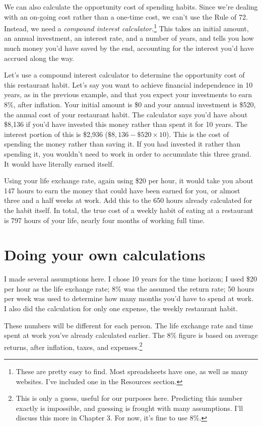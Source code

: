 We can also calculate the opportunity cost of spending habits. Since we're dealing with an on-going cost rather than a one-time cost, we can't use the Rule of 72. Instead, we need a \emph{compound interest calculator.}\footnote{These are pretty easy to find. Most spreadsheets have one, as well as many websites. I've included one in the Resources section.} This takes an initial amount, an annual investment, an interest rate, and a number of years, and tells you how much money you'd have saved by the end, accounting for the interest you'd have accrued along the way.

Let's use a compound interest calculator to determine the opportunity cost of this restaurant habit. Let's say you want to achieve financial independence in 10 years, as in the previous example, and that you expect your investments to earn 8\%, after inflation. Your initial amount is \$0 and your annual investment is \$520, the annual cost of your restaurant habit. The calculator says you'd have about \$8,136 if you'd have invested this money rather than spent it for 10 years. The interest portion of this is \$2,936 ($\$8,136 - \$520 \times 10$). This is the cost of spending the money rather than saving it. If you had invested it rather than spending it, you wouldn't need to work in order to accumulate this three grand. It would have literally earned itself.

Using your life exchange rate, again using \$20 per hour, it would take you about 147 hours to earn the money that could have been earned for you, or almost three and a half weeks at work. Add this to the 650 hours already calculated for the habit itself. In total, the true cost of a weekly habit of eating at a restaurant is 797 hours of your life, nearly four months of working full time.

\section{Doing your own calculations}
I made several assumptions here. I chose 10 years for the time horizon; I used \$20 per hour as the life exchange rate; 8\% was the assumed the return rate; 50 hours per week was used to determine how many months you'd have to spend at work. I also did the calculation for only one expense, the weekly restaurant habit.

These numbers will be different for each person. The life exchange rate and time spent at work you've already calculated earlier. The 8\% figure is based on average returns, after inflation, taxes, and expenses.\footnote{This is only a guess, useful for our purposes here. Predicting this number exactly is impossible, and guessing is frought with many assumptions. I'll discuss this more in Chapter 3. For now, it's fine to use 8\%.}

